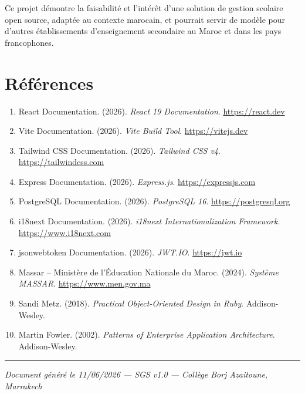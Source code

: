 \documentclass[12pt,a4paper]{report}
\begin{document}
Ce projet démontre la faisabilité et l'intérêt d'une solution de gestion scolaire open source, adaptée au contexte marocain, et pourrait servir de modèle pour d'autres établissements d'enseignement secondaire au Maroc et dans les pays francophones.

\chapter*{Références}

\begin{enumerate}
    \item React Documentation. (2026). \textit{React 19 Documentation}. \url{https://react.dev}
    \item Vite Documentation. (2026). \textit{Vite Build Tool}. \url{https://vitejs.dev}
    \item Tailwind CSS Documentation. (2026). \textit{Tailwind CSS v4}. \url{https://tailwindcss.com}
    \item Express Documentation. (2026). \textit{Express.js}. \url{https://expressjs.com}
    \item PostgreSQL Documentation. (2026). \textit{PostgreSQL 16}. \url{https://postgresql.org}
    \item i18next Documentation. (2026). \textit{i18next Internationalization Framework}. \url{https://www.i18next.com}
    \item jsonwebtoken Documentation. (2026). \textit{JWT.IO}. \url{https://jwt.io}
    \item Massar -- Ministère de l'Éducation Nationale du Maroc. (2024). \textit{Système MASSAR}. \url{https://www.men.gov.ma}
    \item Sandi Metz. (2018). \textit{Practical Object-Oriented Design in Ruby}. Addison-Wesley.
    \item Martin Fowler. (2002). \textit{Patterns of Enterprise Application Architecture}. Addison-Wesley.
\end{enumerate}

\vspace{1cm}
\noindent\rule{\linewidth}{0.4pt}

\noindent\emph{Document généré le 11/06/2026 --- SGS v1.0 --- Collège Borj Azaitoune, Marrakech}
\end{document}
